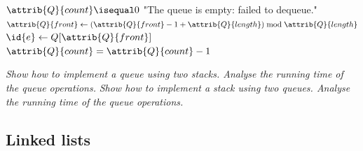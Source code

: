\begin{description}
\begin{ex}
\begin{codebox}
\end{codebox}
\begin{codebox}
    \li \If $\attrib{Q}{count}\isequal0$ \Then
        \li \Error "The queue is empty: failed to dequeue." \End
    \li  $\attrib{Q}{front} \gets (\attrib{Q}{front} -1 + \attrib{Q}{length}) \bmod \attrib{Q}{length}$
    \li  $\id{e} \gets Q[\attrib{Q}{front}]$ 
    \li  $\attrib{Q}{count} = \attrib{Q}{count}-1$
    \li \Return {}
\end{codebox}
\end{ex}
 \textit{Show how to implement a queue using two stacks. Analyse the running time of the queue operations.}
 \textit{Show how to implement a stack using two queues. Analyse the running time of the queue operations.}


\end{description}

\subsection{Linked lists}
\label{sub:linked_lists}


